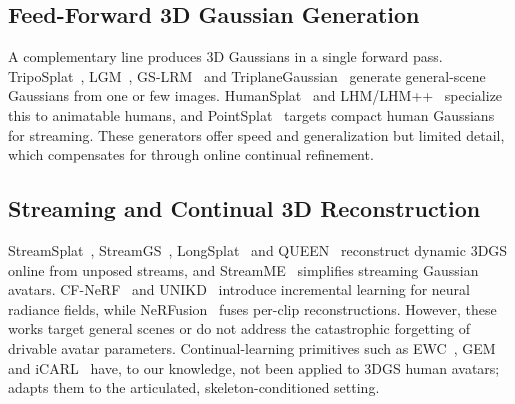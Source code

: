 \subsection{Feed-Forward 3D Gaussian Generation}
A complementary line produces 3D Gaussians in a single forward pass.
TripoSplat~\cite{yan2026triposplat}, LGM~\cite{tang2024lgm},
GS-LRM~\cite{zhang2024gslrm} and TriplaneGaussian~\cite{zou2024triplanegaussian}
generate general-scene Gaussians from one or few images.
HumanSplat~\cite{pan2024humansplat} and LHM/LHM++~\cite{qiu2025lhm,qiu2025lhmpp}
specialize this to animatable humans, and PointSplat~\cite{guo2026pointsplat}
targets compact human Gaussians for streaming. These generators offer speed
and generalization but limited detail, which \method{} compensates for
through online continual refinement.

\subsection{Streaming and Continual 3D Reconstruction}
StreamSplat~\cite{wu2025streamsplat}, StreamGS~\cite{li2025streamgs},
LongSplat~\cite{longsplat2025} and QUEEN~\cite{girish2024queen} reconstruct
dynamic 3DGS online from unposed streams, and
StreamME~\cite{streamme2025} simplifies streaming Gaussian avatars.
CF-NeRF~\cite{yan2023cfnerf} and UNIKD~\cite{unikd2022} introduce
incremental learning for neural radiance fields, while
NeRFusion~\cite{tancik2022nerfusion} fuses per-clip reconstructions.
However, these works target general scenes or do not address the
catastrophic forgetting of drivable avatar parameters. Continual-learning
primitives such as EWC~\cite{kirkpatrick2017overcoming},
GEM~\cite{lopez2017gem} and iCARL~\cite{rebuffi2017icarl} have, to our
knowledge, not been applied to 3DGS human avatars; \method{} adapts them to
the articulated, skeleton-conditioned setting.
